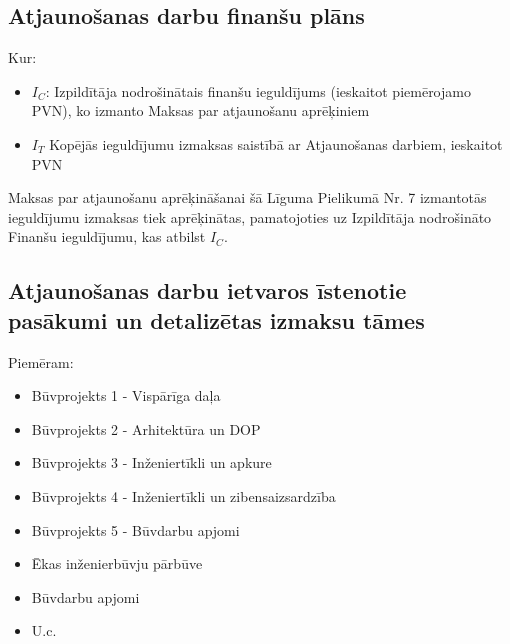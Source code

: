 \subsection{Atjaunošanas darbu finanšu plāns}


\begin{center}
\end{center}

Kur:
\begin{itemize}
  \item $I_C$:    Izpildītāja nodrošinātais finanšu ieguldījums (ieskaitot piemērojamo PVN), ko izmanto Maksas par atjaunošanu aprēķiniem
  \item $I_T$     Kopējās ieguldījumu izmaksas saistībā ar Atjaunošanas darbiem, ieskaitot PVN
\end{itemize}

Maksas par atjaunošanu aprēķināšanai šā Līguma Pielikumā Nr. 7 izmantotās ieguldījumu izmaksas tiek aprēķinātas, pamatojoties uz Izpildītāja nodrošināto Finanšu ieguldījumu, kas atbilst $I_C$.

\subsection{Atjaunošanas darbu ietvaros īstenotie pasākumi un detalizētas izmaksu tāmes}

Piemēram:

\begin{itemize}
	\item Būvprojekts 1 {-} Vispārīga daļa
	\item Būvprojekts 2 {-} Arhitektūra un DOP
	\item Būvprojekts 3 {-} Inženiertīkli un apkure
	\item Būvprojekts 4 {-} Inženiertīkli un zibensaizsardzība
	\item Būvprojekts 5 {-} Būvdarbu apjomi
	\item Ēkas inženierbūvju pārbūve
	\item Būvdarbu apjomi
	\item U.c.
\end{itemize}

